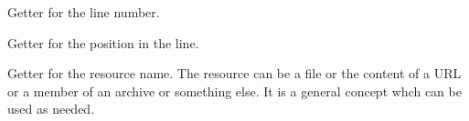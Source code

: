\begin{methods}

    Getter for the line number.

    Getter for the position in the line.

    Getter for the resource name. The resource can be a file or the content of
    a URL or a member of an archive or something else. It is a general concept
    whch can be used as needed.

\end{methods}


\endinput%
%
